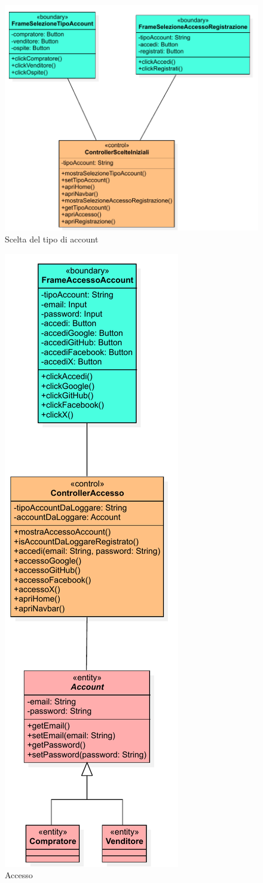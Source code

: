         \begin{figure}[htbp!]
            \centering
                \includegraphics[width=1\linewidth]{Immagini/Diagrammi/Class Diagram/Analisi/Utente che non ha effettuato l'accesso/ScelteIniziali.pdf}
            \caption{Scelta del tipo di account}
        \end{figure}
        
        \begin{figure}[htbp!]
            \centering
                \includegraphics[width=0.35\linewidth]{Immagini/Diagrammi/Class Diagram/Analisi/Utente che non ha effettuato l'accesso/Accesso.pdf}
            \caption{Accesso}
        \end{figure}
        

